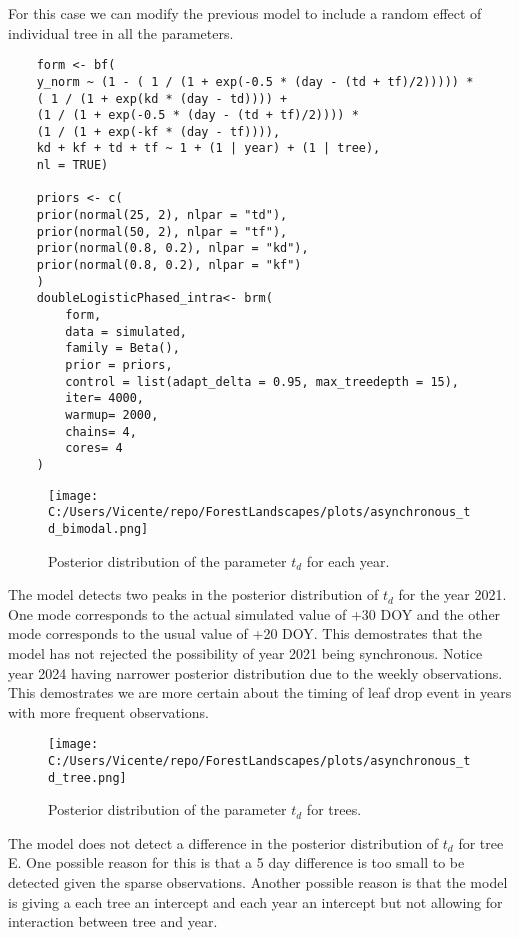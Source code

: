 \documentclass{article}
\begin{document}
For this case we can modify the previous model to include a random effect of individual tree in all the parameters.

\begin{verbatim}
    form <- bf(
    y_norm ~ (1 - ( 1 / (1 + exp(-0.5 * (day - (td + tf)/2))))) *
    ( 1 / (1 + exp(kd * (day - td)))) +
    (1 / (1 + exp(-0.5 * (day - (td + tf)/2)))) *
    (1 / (1 + exp(-kf * (day - tf)))),
    kd + kf + td + tf ~ 1 + (1 | year) + (1 | tree),
    nl = TRUE)

    priors <- c(
    prior(normal(25, 2), nlpar = "td"), 
    prior(normal(50, 2), nlpar = "tf"),    
    prior(normal(0.8, 0.2), nlpar = "kd"),
    prior(normal(0.8, 0.2), nlpar = "kf")
    )
    doubleLogisticPhased_intra<- brm(
        form,
        data = simulated,
        family = Beta(),
        prior = priors,
        control = list(adapt_delta = 0.95, max_treedepth = 15),
        iter= 4000,
        warmup= 2000,
        chains= 4,
        cores= 4
    )
\end{verbatim}

\begin{figure}
    \centering
    \texttt{[image: C:/Users/Vicente/repo/ForestLandscapes/plots/asynchronous\_td\_bimodal.png]}
    \caption{Posterior distribution of the parameter $t_d$ for each year.}
    \label{fig:td_posterior_intra}
\end{figure}

The model detects two peaks in the posterior distribution of $t_d$ for the year 2021.
One mode corresponds to the actual simulated value of +30 DOY and the other mode corresponds to the usual value of +20 DOY.
This demostrates that the model has not rejected the possibility of year 2021 being synchronous.
Notice year 2024 having narrower posterior distribution due to the weekly observations.
This demostrates we are more certain about the timing of leaf drop event in years with more frequent observations.

\begin{figure}
    \centering
    \texttt{[image: C:/Users/Vicente/repo/ForestLandscapes/plots/asynchronous\_td\_tree.png]}
    \caption{Posterior distribution of the parameter $t_d$ for trees.}
    \label{fig:td_posterior_treeE}
\end{figure}

The model does not detect a difference in the posterior distribution of $t_d$ for tree E.
One possible reason for this is that a 5 day difference is too small to be detected given the sparse observations.
Another possible reason is that the model is giving a each tree an intercept and each year an intercept but not allowing for interaction between tree and year.
\end{document}
